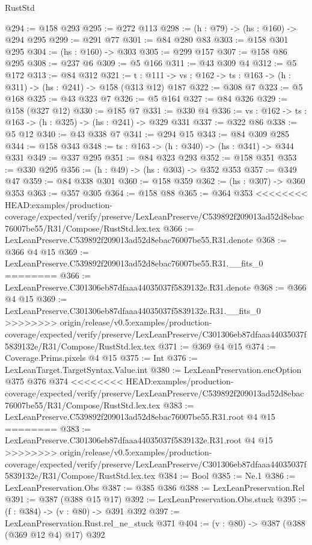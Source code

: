 \begin{lexlean}{RustStd}
\begin{coremodule}
{\begin{coremodule}
@294 := @158 @293
@295 := @272 @113
@298 := (h : @79) -> (hs : @160) -> @294 @295
@299 := @291 @77
@301 := @84 @280 @83
@303 := @158 @301 @295
@304 := (hs : @160) -> @303
@305 := @299 @157
@307 := @158 @86 @295
@308 := @237 @6
@309 := @5 @166
@311 := @43 @309 @4
@312 := @5 @172
@313 := @84 @312
@321 := {t : @111} ->
  {vs : @162} -> {ts : @163} -> (h : @311) -> (hs : @241) -> @158 (@313 @12) @187
@322 := @308 @7
@323 := @5 @168
@325 := @43 @323 @7
@326 := @5 @164
@327 := @84 @326
@329 := @158 (@327 @12)
@330 := @185 @7
@331 := @330 @4
@336 := {vs : @162} -> {ts : @163} -> (h : @325) -> (hs : @241) -> @329 @331
@337 := @322 @86
@338 := @5 @12
@340 := @43 @338 @7
@341 := @294 @15
@343 := @84 @309 @285
@344 := @158 @343
@348 := {ts : @163} -> (h : @340) -> (hs : @341) -> @344 @331
@349 := @337 @295
@351 := @84 @323 @293
@352 := @158 @351
@353 := @330 @295
@356 := (h : @49) -> (hs : @303) -> @352 @353
@357 := @349 @47
@359 := @84 @338 @301
@360 := @158 @359
@362 := (hs : @307) -> @360 @353
@363 := @357 @305
@364 := @158 @88
@365 := @364 @353
<<<<<<<< HEAD:examples/production-coverage/expected/verify/preserve/LexLeanPreserve/C539892f209013ad52d8ebac76007be55/R31/Compose/RustStd.lex.tex
@366 := LexLeanPreserve.C539892f209013ad52d8ebac76007be55.R31.denote
@368 := @366 @4 @15
@369 := LexLeanPreserve.C539892f209013ad52d8ebac76007be55.R31.__fits_0
========
@366 := LexLeanPreserve.C301306eb87dfaaa44035037f5839132e.R31.denote
@368 := @366 @4 @15
@369 := LexLeanPreserve.C301306eb87dfaaa44035037f5839132e.R31.__fits_0
>>>>>>>> origin/release/v0.5:examples/production-coverage/expected/verify/preserve/LexLeanPreserve/C301306eb87dfaaa44035037f5839132e/R31/Compose/RustStd.lex.tex
@371 := @369 @4 @15
@374 := Coverage.Prims.pixels @4 @15
@375 := Int
@376 := LexLeanTarget.TargetSyntax.Value.int
@380 := LexLeanPreservation.encOption @375 @376 @374
<<<<<<<< HEAD:examples/production-coverage/expected/verify/preserve/LexLeanPreserve/C539892f209013ad52d8ebac76007be55/R31/Compose/RustStd.lex.tex
@383 := LexLeanPreserve.C539892f209013ad52d8ebac76007be55.R31.root @4 @15
========
@383 := LexLeanPreserve.C301306eb87dfaaa44035037f5839132e.R31.root @4 @15
>>>>>>>> origin/release/v0.5:examples/production-coverage/expected/verify/preserve/LexLeanPreserve/C301306eb87dfaaa44035037f5839132e/R31/Compose/RustStd.lex.tex
@384 := Bool
@385 := Ne.{1}
@386 := LexLeanPreservation.Obs
@387 := @385 @386
@388 := LexLeanPreservation.Rel
@391 := @387 (@388 @15 @17)
@392 := LexLeanPreservation.Obs.stuck
@395 := (f : @384) -> (v : @80) -> @391 @392
@397 := LexLeanPreservation.Rust.rel_ne_stuck @371
@404 := (v : @80) -> @387 (@388 (@369 @12 @4) @17) @392

\end{coremodule}}
\end{coremodule}
\end{lexlean}
